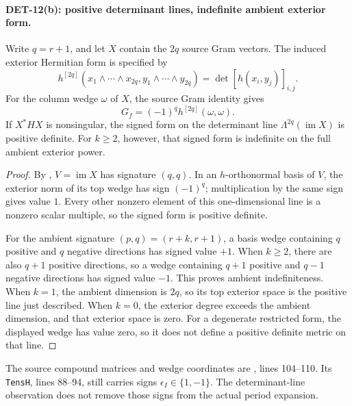 \paragraph{DET-12(b): positive determinant lines, indefinite ambient exterior form.}
Write \(q=r+1\), and let \(X\) contain the \(2q\) source Gram vectors.
The induced exterior Hermitian form is specified by
\[
 h^{[2q]}(x_1\wedge\cdots\wedge x_{2q},
          y_1\wedge\cdots\wedge y_{2q})
 =\det[h(x_i,y_j)]_{i,j}.
\]
For the column wedge \(\omega\) of \(X\), the source Gram identity gives
\[
 G_f=(-1)^q h^{[2q]}(\omega,\omega).
\]
If \(X^*HX\) is nonsingular, the signed form on the determinant line
\(\Lambda^{2q}(\operatorname{im}X)\) is positive definite. For \(k\ge2\),
however, that signed form is indefinite on the full ambient exterior
power.
\begin{proof}
By , \(V=\operatorname{im}X\) has signature \((q,q)\).
In an \(h\)-orthonormal basis of \(V\), the exterior norm of its top
wedge has sign \((-1)^q\); multiplication by the same sign gives
value \(1\). Every other nonzero element of this one-dimensional line
is a nonzero scalar multiple, so the signed form is positive definite.

For the ambient signature \((p,q)=(r+k,r+1)\), a basis wedge
containing \(q\) positive and \(q\) negative directions has signed
value \(+1\). When \(k\ge2\), there are also \(q+1\) positive directions,
so a wedge containing \(q+1\) positive and \(q-1\) negative directions
has signed value \(-1\). This proves ambient indefiniteness.
When \(k=1\), the ambient dimension is \(2q\), so its top exterior
space is the positive line just described. When \(k=0\), the exterior
degree exceeds the ambient dimension, and that exterior space is zero.
For a degenerate restricted form, the displayed wedge has value zero,
so it does not define a positive definite metric on that line.
\end{proof}
The source compound matrices and wedge coordinates are
,
lines 104--110. Its \texttt{TensH}, lines 88--94, still carries
signs \(\epsilon_I\in\{1,-1\}\). The determinant-line observation
does not remove those signs from the actual period expansion.


